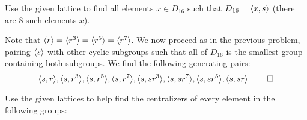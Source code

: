  Use the given lattice to find all elements $x\in D_{16}$
such that $D_{16} = \langle{x, s}\rangle$ (there are $8$ such elements $x$).
\begin{solution}
  Note that $\langle{r}\rangle = \langle{r^3}\rangle = \langle{r^5}\rangle = \langle{r^7}\rangle$. We now
  proceed as in the previous problem, pairing $\langle{s}\rangle$ with other
  cyclic subgroups such that all of $D_{16}$ is the smallest group
  containing both subgroups. We find the following generating pairs:
  \begin{equation*}
    \langle{s,r}\rangle,\langle{s,r^3}\rangle,\langle{s,r^5}\rangle,\langle{s,r^7}\rangle,
    \langle{s,sr^3}\rangle, \langle{s,sr^7}\rangle,\langle{s,sr^5}\rangle,\langle{s,sr}\rangle.
    \qedhere
  \end{equation*}
\end{solution}

 Use the given lattices to help find the centralizers of
every element in the following groups:
